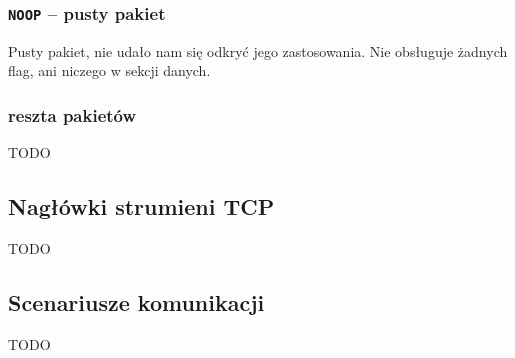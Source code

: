 \documentclass[11pt,leqno]{article}
\begin{document}
\subsubsection{\texttt{NOOP} -- pusty pakiet}

Pusty pakiet, nie udało nam się odkryć jego zastosowania. Nie obsługuje żadnych flag, ani niczego
w sekcji danych.

\subsubsection{reszta pakietów}

TODO

\subsection{Nagłówki strumieni TCP}

TODO

\subsection{Scenariusze komunikacji}

TODO
\end{document}
